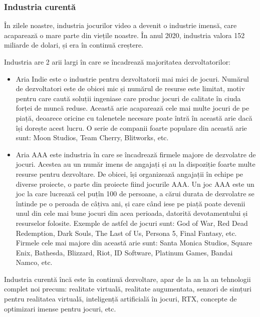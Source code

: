\documentclass[12pt, a4paper]{article}
\begin{document}
	
	
	
	
	\subsubsection{Industria curentă}
	
	În zilele noastre, industria jocurilor video a devenit o industrie imensă, care acaparează o mare parte din viețile noastre. În anul 2020, industria valora 152 miliarde de dolari, și era în continuă creștere.
	\newline
	
	Industria are 2 arii largi în care se încadrează majoritatea dezvoltatorilor:
	
	\begin{itemize}
		\item Aria Indie este o industrie pentru dezvoltatorii mai mici de jocuri. Numărul de dezvoltatori este de obicei mic și numărul de resurse este limitat, motiv pentru care caută soluții ingeniase care produc jocuri de calitate în ciuda forței de muncă reduse. Această arie acaparează cele mai multe jocuri de pe piață, deoarece oricine cu talenetele necesare poate întră în această arie dacă își dorește acest lucru. O serie de companii foarte populare din această arie sunt: Moon Studios, Team Cherry, Blitworks, etc.
		\item Aria AAA este industria în care se încadrează firmele majore de dezvolatre de jocuri. Acestea au un număr imens de angajați și au la dispoziție foarte multe resurse pentru dezvoltare. De obicei, își organizează angajații în echipe pe diverse proiecte, o parte din proiecte fiind jocurile AAA. Un joc AAA este un joc la care lucrează cel puțîn 100 de persoane, a cărui durata de dezvolatre se întinde pe o peroada de câțiva ani, și care când iese pe piață poate devenii unul din cele mai bune jocuri din acea perioada, datorită devotamentului și resurselor folosite. Exemple de astfel de jocuri sunt: God of War, Red Dead Redemption, Dark Souls, The Last of Us, Persona 5, Final Fantasy, etc. Firmele cele mai majore din această arie sunt: Santa Monica Studios, Square Enix, Bathesda, Blizzard, Riot, ID Software, Platinum Games, Bandai Namco, etc.
	\end{itemize}
	
	Industria curentă încă este în continuă dezvoltare, apar de la an la an tehnologii complet noi precum: realitate virtuală, realitate augumentata, senzori de simțuri pentru realitatea virtuală, inteligență artificială în jocuri, RTX, concepte de optimizari imense pentru jocuri, etc.
	
\end{document}
